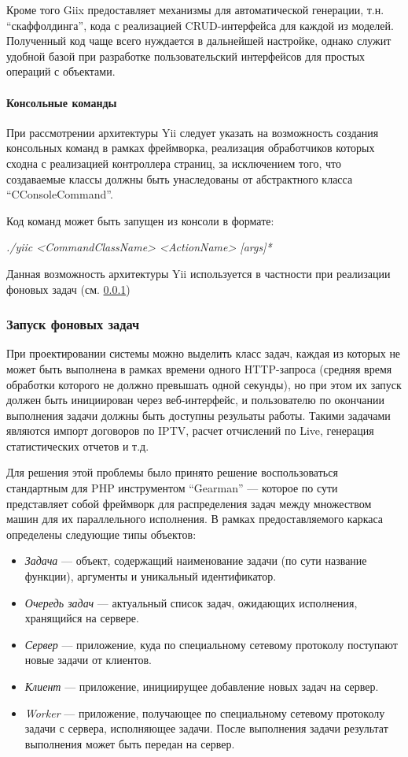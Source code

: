 Кроме того Giix предоставляет механизмы для автоматической генерации, т.н. ``скаффолдинга'', кода с реализацией
CRUD-интерфейса для каждой из моделей. Полученный код чаще всего нуждается в дальнейшей настройке, однако 
служит удобной базой при разработке пользовательский интерфейсов для простых операций с объектами.

\paragraph{Консольные команды} При рассмотрении архитектуры Yii следует указать на возможность 
создания консольных команд в рамках фреймворка, реализация обработчиков которых сходна с 
реализацией контроллера страниц, за исключением того, что создаваемые классы должны быть унаследованы
от абстрактного класса ``CConsoleCommand''. 

Код команд может быть запущен из консоли в формате:

\textit{./yiic <CommandClassName> <ActionName> [args]*}

Данная возможность архитектуры Yii используется в частности при реализации фоновых задач (см. \ref{task:background}) 

\subsubsection{Запуск фоновых задач}
\label{task:background}
При проектировании системы можно выделить класс задач, каждая из которых
не может быть выполнена в рамках времени одного HTTP-запроса (средняя время обработки которого
не должно превышать одной секунды), но при этом их запуск должен быть инициирован через веб-интерфейс, и
пользователю по окончании выполнения задачи должны быть доступны резульаты работы. Такими задачами являются
импорт договоров по IPTV, расчет отчислений по Live, генерация статистических отчетов и т.д.

Для решения этой проблемы было принято решение воспользоваться стандартным для PHP инструментом 
``Gearman''\cite{gearman} --- которое по сути представляет собой фреймворк для распределения задач между множеством
машин для их параллельного исполнения. В рамках предоставляемого каркаса определены следующие типы объектов:
\begin{itemize}
\item{
  \textit{Задача} --- объект, содержащий наименование задачи (по сути название функции), аргументы и уникальный идентификатор.
}
\item{
  \textit{Очередь задач} --- актуальный список задач, ожидающих исполнения, хранящийся на сервере.
}
\item{
  \textit{Сервер} --- приложение, куда по специальному сетевому протоколу поступают новые задачи от клиентов.
}
\item{
  \textit{Клиент} --- приложение, инициирущее добавление новых задач на сервер.
}
\item{
  \textit{Worker} --- приложение, получающее по специальному сетевому протоколу задачи с сервера,
исполняющее задачи. После выполнения задачи результат выполнения может быть передан на сервер.
}
\end{itemize}

